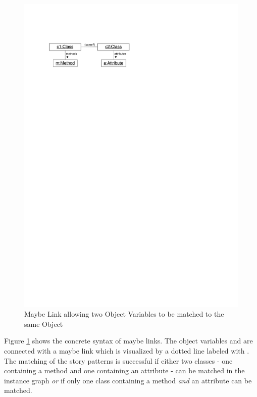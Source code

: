 
\begin{figure}[htb]
  \centering
  \includegraphics[scale=.8]{figures/MaybeLink}
  \caption{Maybe Link allowing two Object Variables to be matched to the same Object}
  \label{fig:maybeLink}
\end{figure}

Figure \ref{fig:maybeLink} shows the concrete syntax of maybe links. The object variables  and  are connected with a maybe link which is visualized by a dotted line labeled with .
The matching of the story patterns is successful if either two classes - one containing a method and one containing an attribute - can be matched in the instance graph \emph{or} if only one class containing a method \emph{and} an attribute can be matched.

